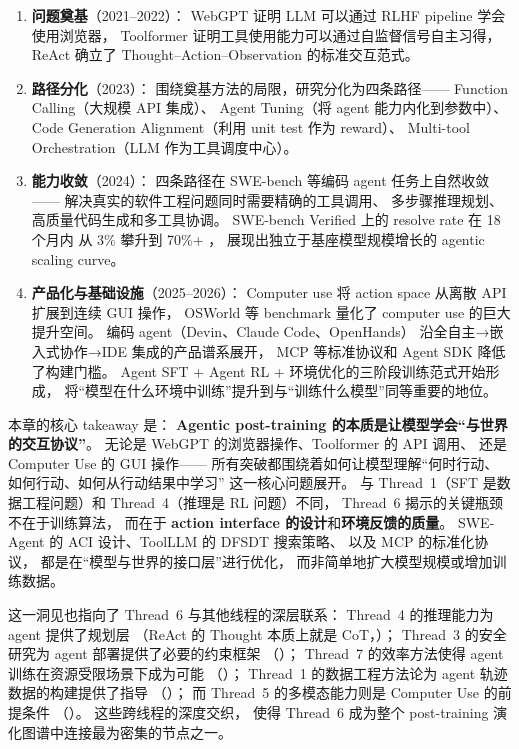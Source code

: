 \begin{enumerate}[leftmargin=2em]
  \item \textbf{问题奠基}（2021--2022）：
    WebGPT 证明 LLM 可以通过 RLHF pipeline 学会使用浏览器，
    Toolformer 证明工具使用能力可以通过自监督信号自主习得，
    ReAct 确立了 Thought--Action--Observation 的标准交互范式。

  \item \textbf{路径分化}（2023）：
    围绕奠基方法的局限，研究分化为四条路径——
    Function Calling（大规模 API 集成）、
    Agent Tuning（将 agent 能力内化到参数中）、
    Code Generation Alignment（利用 unit test 作为 reward）、
    Multi-tool Orchestration（LLM 作为工具调度中心）。

  \item \textbf{能力收敛}（2024）：
    四条路径在 SWE-bench 等编码 agent 任务上自然收敛——
    解决真实的软件工程问题同时需要精确的工具调用、
    多步骤推理规划、高质量代码生成和多工具协调。
    SWE-bench Verified 上的 resolve rate 在 18 个月内
    从 3\% 攀升到 70\%+ ，
    展现出独立于基座模型规模增长的 agentic scaling curve。

  \item \textbf{产品化与基础设施}（2025--2026）：
    Computer use 将 action space 从离散 API 扩展到连续 GUI 操作，
    OSWorld 等 benchmark 量化了 computer use 的巨大提升空间。
    编码 agent（Devin、Claude Code、OpenHands）
    沿全自主→嵌入式协作→IDE 集成的产品谱系展开，
    MCP 等标准协议和 Agent SDK 降低了构建门槛。
    Agent SFT + Agent RL + 环境优化的三阶段训练范式开始形成，
    将``模型在什么环境中训练''提升到与``训练什么模型''同等重要的地位。
\end{enumerate}


\noindent
本章的核心 takeaway 是：
\textbf{Agentic post-training 的本质是让模型学会``与世界的交互协议''}。
无论是 WebGPT 的浏览器操作、Toolformer 的 API 调用、
还是 Computer Use 的 GUI 操作——
所有突破都围绕着如何让模型理解``何时行动、如何行动、如何从行动结果中学习''
这一核心问题展开。
与 Thread~1（SFT 是数据工程问题）和 Thread~4（推理是 RL 问题）不同，
Thread~6 揭示的关键瓶颈不在于训练算法，
而在于 \textbf{action interface 的设计}和\textbf{环境反馈的质量}。
SWE-Agent 的 ACI 设计、ToolLLM 的 DFSDT 搜索策略、
以及 MCP 的标准化协议，
都是在``模型与世界的接口层''进行优化，
而非简单地扩大模型规模或增加训练数据。

这一洞见也指向了 Thread~6 与其他线程的深层联系：
Thread~4 的推理能力为 agent 提供了规划层
（ReAct 的 Thought 本质上就是 CoT，）；
Thread~3 的安全研究为 agent 部署提供了必要的约束框架
（）；
Thread~7 的效率方法使得 agent 训练在资源受限场景下成为可能
（）；
Thread~1 的数据工程方法论为 agent 轨迹数据的构建提供了指导
（）；
而 Thread~5 的多模态能力则是 Computer Use 的前提条件
（）。
这些跨线程的深度交织，
使得 Thread~6 成为整个 post-training 演化图谱中连接最为密集的节点之一。
